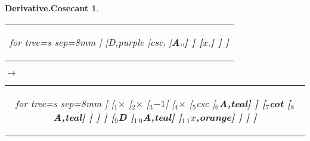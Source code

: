 \documentclass[UTF8,10pt]{ctexart}
\newcommand{\subtreeA}{\bf A}
\newcommand{\I}{$_{\scriptscriptstyle 1}$}
\newcommand{\II}{$_{\scriptscriptstyle 2}$}
\newcommand{\III}{$_{\scriptscriptstyle 3}$}
\newcommand{\IV}{$_{\scriptscriptstyle 4}$}
\newcommand{\V}{$_{\scriptscriptstyle 5}$}
\newcommand{\VI}{$_{\scriptscriptstyle 6}$}
\newcommand{\VII}{$_{\scriptscriptstyle 7}$}
\newcommand{\VIII}{$_{\scriptscriptstyle 8}$}
\newcommand{\IX}{$_{\scriptscriptstyle 9}$}
\newcommand{\X}{$_{\scriptscriptstyle 1\:\!\!0}$}
\newcommand{\XI}{$_{\scriptscriptstyle 1\:\!\!1}$}
\newcommand{\lc}{$_{\:\!\scriptscriptstyle\rm l\!}$}
\newcommand{\rc}{$_{\:\!\scriptscriptstyle\rm r\!}$}
\newcommand{\Derivative}{\rm D}
\newcommand{\x}{$x$}
\newcommand{\NegativeOne}{$-1$}
\newcommand{\Multiplication}{$\times$}
\newcommand{\Cotangent}{\rm cot}
\newcommand{\Cosecant}{\rm csc}
\newtheorem*{Derivative.Cosecant}{\bf Derivative.Cosecant }
\begin{document}
\begin{center}
\begin{Derivative.Cosecant}
			\begin{tabular}{c}
				\begin{forest}
					for tree={s sep=8mm}
					[
						[\Derivative,purple
							[\Cosecant\lc
								[\subtreeA\lc\lc]
							]
							[\x\rc]
						]
					]
				\end{forest}
			\end{tabular}
			\qquad
			$\longrightarrow$
			\qquad
			\begin{tabular}{c}
				\begin{forest}
					for tree={s sep=8mm}
					[
						[\I\Multiplication
							[\II\Multiplication
								[\III\NegativeOne]
								[\IV\Multiplication
									[\V\Cosecant
										[\VI\subtreeA,teal]
									]
									[\VII\Cotangent
										[\VIII\subtreeA,teal]
									]
								]
							]
							[\IX\Derivative
								[\X\subtreeA,teal]
								[\XI\x,orange]
							]
						]
					]
				\end{forest}
			\end{tabular}
		\end{Derivative.Cosecant}
	\vspace*{\fill}\end{center}

	\newpage
\end{document}
